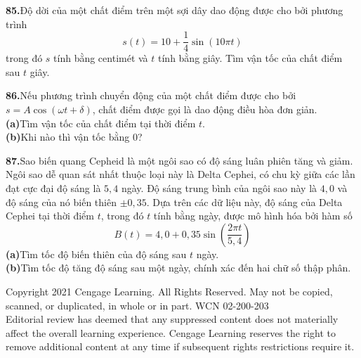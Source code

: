 \begin{minipage}[t]{0.64\textwidth}
\vspace{0.65em}
\textbf{85.}\enspace Độ dời của một chất điểm trên một sợi dây dao động được cho bởi phương trình
\[
s(t) = 10 + \frac{1}{4}\sin(10\pi t)
\]
trong đó $s$ tính bằng centimét và $t$ tính bằng giây. Tìm vận tốc của chất điểm sau $t$ giây.

\vspace{0.6em}
\textbf{86.}\enspace Nếu phương trình chuyển động của một chất điểm được cho bởi $s = A\cos(\omega t + \delta)$, chất điểm được gọi là dao động điều hòa đơn giản.\\[0.2em]
\textbf{(a)}\enspace Tìm vận tốc của chất điểm tại thời điểm $t$.\\[0.2em]
\textbf{(b)}\enspace Khi nào thì vận tốc bằng 0?

\vspace{0.6em}
\textbf{87.}\enspace Sao biến quang Cepheid là một ngôi sao có độ sáng luân phiên tăng và giảm. Ngôi sao dễ quan sát nhất thuộc loại này là Delta Cephei, có chu kỳ giữa các lần đạt cực đại độ sáng là $5{,}4$ ngày. Độ sáng trung bình của ngôi sao này là $4{,}0$ và độ sáng của nó biến thiên $\pm 0{,}35$. Dựa trên các dữ liệu này, độ sáng của Delta Cephei tại thời điểm $t$, trong đó $t$ tính bằng ngày, được mô hình hóa bởi hàm số
\[
B(t) = 4{,}0 + 0{,}35\sin\left(\frac{2\pi t}{5{,}4}\right)
\]
\textbf{(a)}\enspace Tìm tốc độ biến thiên của độ sáng sau $t$ ngày.\\[0.2em]
\textbf{(b)}\enspace Tìm tốc độ tăng độ sáng sau một ngày, chính xác đến hai chữ số thập phân.
\end{minipage}

\vfill
\begin{center}
\fontsize{6.5pt}{8pt}\selectfont\color{copyrightgray}
Copyright 2021 Cengage Learning. All Rights Reserved. May not be copied, scanned, or duplicated, in whole or in part. WCN 02-200-203\\
Editorial review has deemed that any suppressed content does not materially affect the overall learning experience. Cengage Learning reserves the right to remove additional content at any time if subsequent rights restrictions require it.
\end{center}
